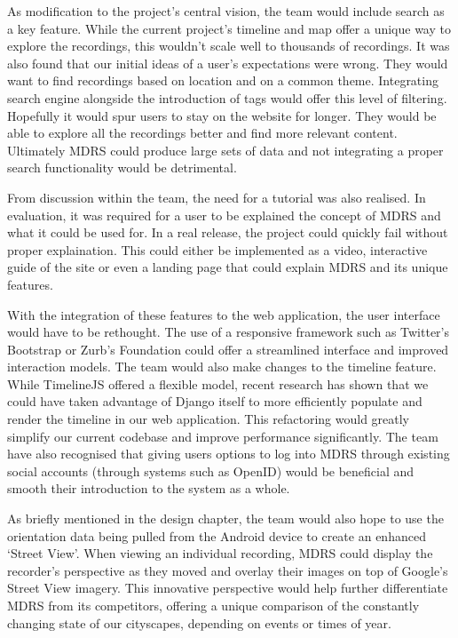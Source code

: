 \documentclass{l3proj}
\begin{document}
As modification to the project's central vision, the team would include search as a key feature. While the current project's timeline and map offer a unique way to explore the recordings, this wouldn't scale well to thousands of recordings. It was also found that our initial ideas of a user's expectations were wrong. They would want to find recordings based on location and on a common theme. Integrating search engine alongside the introduction of tags would offer this level of filtering. Hopefully it would spur users to stay on the website for longer. They would be able to explore all the recordings better and find more relevant content. Ultimately MDRS could produce large sets of data and not integrating a proper search functionality would be detrimental.

From discussion within the team, the need for a tutorial was also realised. In evaluation, it was required for a user to be explained the concept of MDRS and what it could be used for. In a real release, the project could quickly fail without proper explaination. This could either be implemented as a video, interactive guide of the site or even a landing page that could explain MDRS and its unique features.

With the integration of these features to the web application, the user interface would have to be rethought. The use of a responsive framework such as Twitter's Bootstrap or Zurb's Foundation could offer a streamlined interface and improved interaction models. The team would also make changes to the timeline feature. While TimelineJS offered a flexible model, recent research has shown that we could have taken advantage of \gls{Django} itself to more efficiently populate and render the timeline in our web application. This refactoring would greatly simplify our current codebase and improve performance significantly. The team have also recognised that giving users options to log into MDRS through existing social accounts (through systems such as OpenID) would be beneficial and smooth their introduction to the system as a whole.

As briefly mentioned in the design chapter, the team would also hope to use the orientation data being pulled from the Android device to create an enhanced ‘Street View’. When viewing an individual recording, MDRS could display the recorder’s perspective as they moved and overlay their images on top of Google’s Street View imagery. This innovative perspective would help further differentiate MDRS from its competitors, offering a unique comparison of the constantly changing state of our cityscapes, depending on events or times of year.
\end{document}
